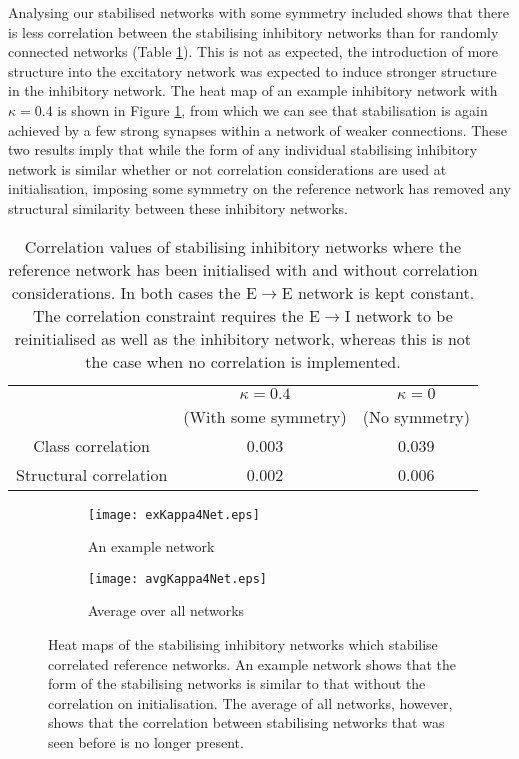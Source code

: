 \documentclass[12pt, a4paper]{article}
\begin{document}
Analysing our stabilised networks with some symmetry included shows that there is less correlation between the stabilising inhibitory networks than for randomly connected networks (Table \ref{tab:kappaCorr}).  This is not as expected, the introduction of more structure into the excitatory network was expected to induce stronger structure in the inhibitory network.  The heat map of an example inhibitory network with $\kappa = 0.4$ is shown in Figure \ref{fig:exKappa0.4Net}, from which we can see that stabilisation is again achieved by a few strong synapses within a network of weaker connections.  These two results imply that while the form of any individual stabilising inhibitory network is similar whether or not correlation considerations are used at initialisation, imposing some symmetry on the reference network has removed any structural similarity between these inhibitory networks. 
 
\begin{table}
    \centering
            \begin{tabular}{|c || c | c|}
                \hline
                                            & $\kappa = 0.4$     & $\kappa = 0$  \\
                                            & (With some symmetry) & (No symmetry) \\
                \hline
                Class correlation            &    0.003   &  0.039      \\
                Structural correlation       &    0.002   &  0.006      \\
                \hline
            \end{tabular}
            \caption{Correlation values of stabilising inhibitory networks where the reference network has been initialised with and without correlation considerations.  In both cases the E$\rightarrow$E network is kept constant.  The correlation constraint requires the E$\rightarrow$I network to be reinitialised as well as the inhibitory network, whereas this is not the case when no correlation is implemented.\label{tab:kappaCorr}}
\end{table}

\begin{figure}[htb]
    \begin{subfigure}{0.5\textwidth}
        \texttt{[image: exKappa4Net.eps]}
        \caption{An example network}
        \label{fig:exKappa0.4Net}
    \end{subfigure}
    \begin{subfigure}{0.5\textwidth}
        \texttt{[image: avgKappa4Net.eps]}
        \caption{Average over all networks}
        \label{fig:avgKappa0.4.Net}
    \end{subfigure}
    \caption{Heat maps of the stabilising inhibitory networks which stabilise correlated reference networks.  An example network shows that the form of the stabilising networks is similar to that without the correlation on initialisation.  The average of all networks, however, shows that the correlation between stabilising networks that was seen before is no longer present.}

\end{figure}
\end{document}
